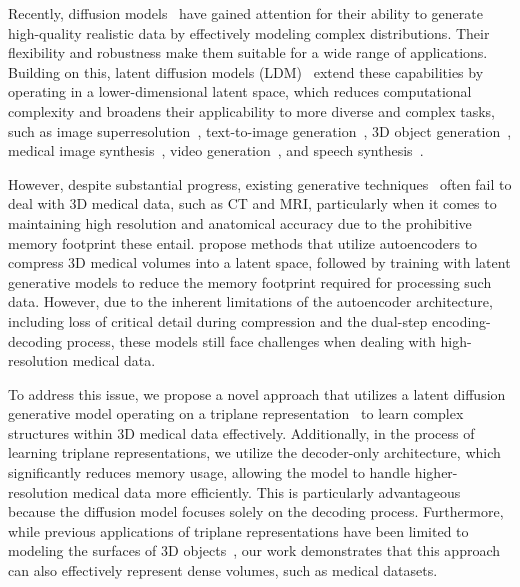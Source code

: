 \documentclass[letterpaper]{article} %
\begin{document}
Recently, diffusion models~\cite{ho2020denoising} have gained attention for their ability to generate high-quality realistic data by effectively modeling complex distributions. Their flexibility and robustness make them suitable for a wide range of applications. Building on this, latent diffusion models (LDM)~\cite{rombach2022high} extend these capabilities by operating in a lower-dimensional latent space, which reduces computational complexity and broadens their applicability to more diverse and complex tasks, such as image superresolution~\cite{zhao2023partdiff}, text-to-image generation~\cite{rombach2022high}, 3D object generation~\cite{shue20233d,ntavelis2023autodecoding}, medical image synthesis~\cite{kwon2019generation,Pinaya2022BrainIG,Khader2022MedicalDD}, video generation~\cite{wang2023lavie}, and speech synthesis~\cite{liu2023diffvoice}.

However, despite substantial progress, existing generative techniques~\cite{segato2020data,chong2021synthesis,Pinaya2022BrainIG,Khader2022MedicalDD} often fail to deal with 3D medical data, such as CT and MRI, particularly when it comes to maintaining high resolution and anatomical accuracy due to the prohibitive memory footprint these entail. \cite{kwon2019generation,Pinaya2022BrainIG,Khader2022MedicalDD} propose methods that utilize autoencoders to compress 3D medical volumes into a latent space, followed by training with latent generative models to reduce the memory footprint required for processing such data. However, due to the inherent limitations of the autoencoder architecture, including loss of critical detail during compression and the dual-step encoding-decoding process, these models still face challenges when dealing with high-resolution medical data. 

To address this issue, we propose a novel approach that utilizes a latent diffusion generative model operating on a triplane representation~\cite{chan2022efficient} to learn complex structures within 3D medical data effectively. Additionally, in the process of learning triplane representations, we utilize the decoder-only architecture, which significantly reduces memory usage, allowing the model to handle higher-resolution medical data more efficiently. This is particularly advantageous because the diffusion model focuses solely on the decoding process. Furthermore, while previous applications of triplane representations have been limited to modeling the surfaces of 3D objects~\cite{chan2022efficient,shue20233d}, our work demonstrates that this approach can also effectively represent dense volumes, such as medical datasets.
\end{document}
